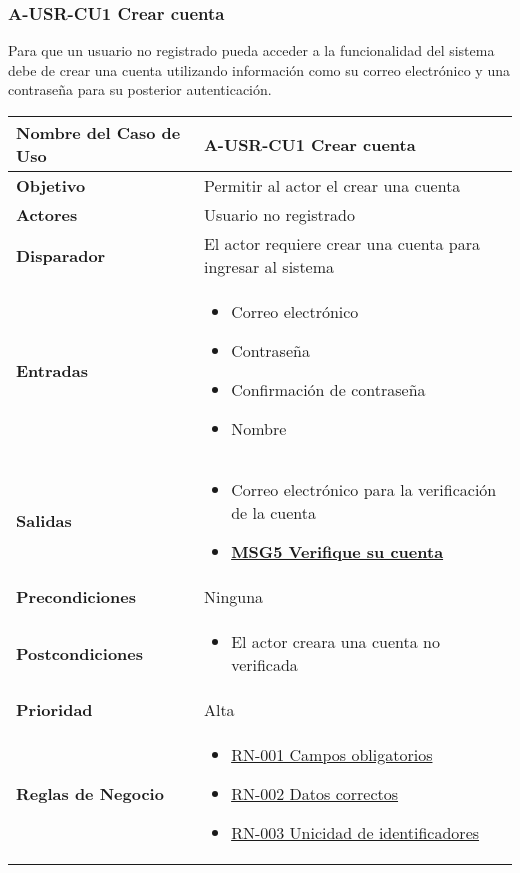 \subsubsection{A-USR-CU1 Crear cuenta}
Para que un usuario no registrado pueda acceder a la funcionalidad del sistema debe de crear una cuenta utilizando información como su correo electrónico y una contraseña para su posterior autenticación.
\begin{longtable}{|J{5cm}|J{10.3cm}|}
	\hline
	\textbf{Nombre del Caso de Uso} &
		A-USR-CU1 Crear cuenta \\ \hline
	\textbf{Objetivo} &
		Permitir al actor el crear una cuenta \\ \hline
	\textbf{Actores} &
		Usuario no registrado \\ \hline 
	\textbf{Disparador} & 
		El actor requiere crear una cuenta para ingresar al sistema \\ \hline 
	\textbf{Entradas} & 
		\begin{itemize}
				\item Correo electrónico
				\item Contraseña
			    \item Confirmación de contraseña
			    \item Nombre
		\end{itemize}\\ \hline 
	\textbf{Salidas} & 
	    \begin{itemize}
		\item Correo electrónico para la verificación de la cuenta
		\item \hyperref[MSG5]{\bf MSG5 Verifique su cuenta}
		\end{itemize} \\ \hline
	\textbf{Precondiciones} &
        Ninguna \\ \hline
	\textbf{Postcondiciones} &
		\begin{itemize}
			\item El actor creara una cuenta no verificada
		\end{itemize}\\ \hline
	\textbf{Prioridad} & 
		Alta \\ \hline
	\textbf{Reglas de Negocio} & 
		\begin{itemize}
			\item \hyperref[RN001]{RN-001 Campos obligatorios}
			\item \hyperref[RN002]{RN-002 Datos correctos}
			\item \hyperref[RN003]{RN-003 Unicidad de identificadores}
		\end{itemize} \\ \hline

\end{longtable}
